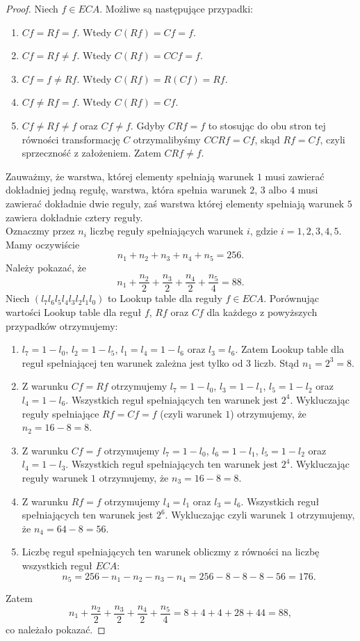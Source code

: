\documentclass{xmgr}
\begin{document}
\begin{proof}
 Niech $f \in ECA$. Możliwe są następujące przypadki:
 \begin{enumerate}
  \item $Cf = Rf = f$. Wtedy $C(Rf) = Cf = f$.
  \item $Cf = Rf \neq f$. Wtedy $C(Rf) = CCf = f$.
  \item $Cf = f \neq Rf$. Wtedy $C(Rf) = R(Cf) = Rf$.
  \item $Cf \neq Rf = f$. Wtedy $C(Rf) = Cf$.
  \item $Cf \neq Rf \neq f$ oraz $Cf \neq f$. Gdyby $CRf = f$ to stosując do obu stron tej równości transformację $C$
  otrzymalibyśmy $CCRf = Cf$, skąd $Rf = Cf$, czyli sprzeczność z założeniem. Zatem $CRf \neq f$.
 \end{enumerate}
Zauważmy, że warstwa, której elementy spełniają warunek $1$ musi zawierać dokładniej jedną regułę, warstwa, która spełnia warunek $2$, $3$ albo
$4$ musi zawierać dokładnie dwie reguły, zaś warstwa której elementy spełniają warunek $5$ zawiera dokładnie cztery reguły.
\\Oznaczmy przez $n_{i}$ liczbę reguły spełniających warunek $i$, gdzie $i = 1,2,3,4,5$. Mamy oczywiście
\[
 n_{1} + n_{2} + n_{3} + n_{4} + n_{5} = 256.
\]
Należy pokazać, że
\[
 n_{1} + \frac{n_{2}}{2} + \frac{n_{3}}{2} + \frac{n_{4}}{2} + \frac{n_{5}}{4} = 88.
\]
Niech $(l_{7}l_{6}l_{5}l_{4}l_{3}l_{2}l_{1}l_{0})$ to Lookup table dla reguły $f \in ECA$. Porównując wartości Lookup table dla reguł $f$, $Rf$
oraz $Cf$ dla każdego z powyższych przypadków otrzymujemy:
\begin{enumerate}
 \item $l_{7} = 1 - l_{0}$, $l_{2} = 1 - l_{5}$, $l_{1} = l_{4} = 1 - l_{6}$ oraz $l_{3} = l_{6}$. Zatem Lookup table dla reguł spełniającej 
 ten warunek zależna jest tylko od $3$ liczb. Stąd $n_{1} = 2^{3} = 8$.
 \item Z warunku $Cf = Rf$ otrzymujemy $l_{7} = 1 - l_{0}$, $l_{3} = 1 - l_{1}$, $l_{5} = 1 - l_{2}$ oraz $l_{4} = 1- l_{6}$. Wszystkich reguł
 spełniających ten warunek jest $2^{4}$. Wykluczając reguły spełniające $Rf = Cf = f$ (czyli warunek $1$) otrzymujemy, że $n_{2} = 16 - 8 = 8$.
 \item Z warunku $Cf = f$ otrzymujemy $l_{7} = 1 - l_{0}$, $l_{6} = 1 - l_{1}$, $l_{5} = 1 - l_{2}$ oraz $l_{4} = 1- l_{3}$. Wszystkich reguł
 spełniających ten warunek jest $2^{4}$. Wykluczając reguły warunek $1$ otrzymujemy, że $n_{3} = 16 - 8 = 8$.
 \item Z warunku $Rf = f$ otrzymujemy $l_{4} = l_{1}$ oraz $l_{3} = l_{6}$. Wszystkich reguł spełniających ten warunek jest $2^{6}$. 
 Wykluczając czyli warunek $1$ otrzymujemy, że $n_{4} = 64 - 8 = 56$.
 \item Liczbę reguł spełniających ten warunek obliczmy z równości na liczbę wszystkich reguł $ECA$:
 \[
  n_{5} = 256 - n_{1} - n_{2} - n_{3} - n_{4} = 256 - 8 - 8 - 8 - 56 = 176.
 \]
\end{enumerate}
 Zatem
 \[
    n_{1} + \frac{n_{2}}{2} + \frac{n_{3}}{2} + \frac{n_{4}}{2} + \frac{n_{5}}{4} = 8 + 4 + 4 + 28 + 44 = 88,
 \]
co należało pokazać.

\end{proof}
\end{document}
